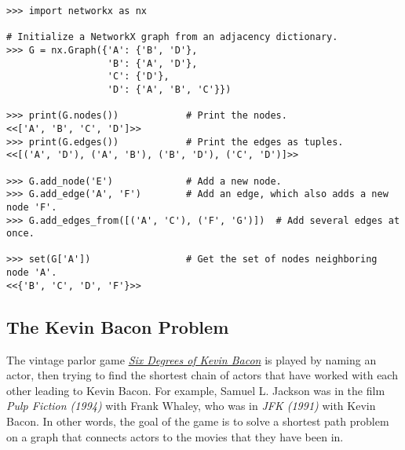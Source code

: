 \begin{lstlisting}
>>> import networkx as nx

# Initialize a NetworkX graph from an adjacency dictionary.
>>> G = nx.Graph({'A': {'B', 'D'},
                  'B': {'A', 'D'},
                  'C': {'D'},
                  'D': {'A', 'B', 'C'}})

>>> print(G.nodes())            # Print the nodes.
<<['A', 'B', 'C', 'D']>>
>>> print(G.edges())            # Print the edges as tuples.
<<[('A', 'D'), ('A', 'B'), ('B', 'D'), ('C', 'D')]>>

>>> G.add_node('E')             # Add a new node.
>>> G.add_edge('A', 'F')        # Add an edge, which also adds a new node 'F'.
>>> G.add_edges_from([('A', 'C'), ('F', 'G')])  # Add several edges at once.

>>> set(G['A'])                 # Get the set of nodes neighboring node 'A'.
<<{'B', 'C', 'D', 'F'}>>
\end{lstlisting}

\subsection*{The Kevin Bacon Problem} %

The vintage parlor game \href{http://oracleofbacon.org/help.php}{\emph{Six Degrees of Kevin Bacon}} is played by naming an actor, then trying to find the shortest chain of actors that have worked with each other leading to Kevin Bacon.
For example, Samuel L. Jackson was in the film \emph{Pulp Fiction (1994)} with Frank Whaley, who was in \emph{JFK (1991)} with Kevin Bacon.
In other words, the goal of the game is to solve a shortest path problem on a graph that connects actors to the movies that they have been in.

